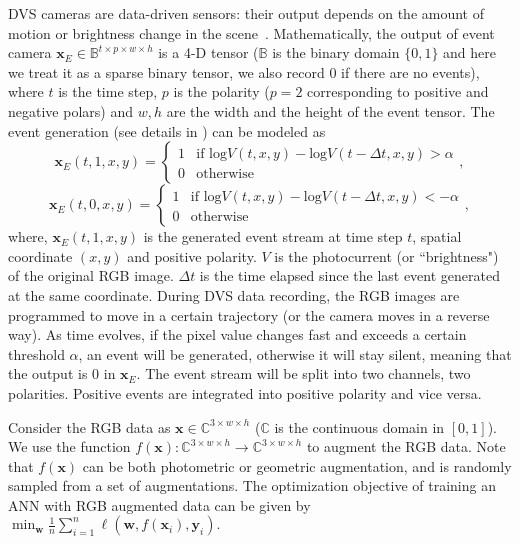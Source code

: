 \documentclass[runningheads]{llncs}
\begin{document}
DVS cameras are data-driven sensors: their output depends on the amount of motion or brightness change in the scene~\cite{gallego2019event}. Mathematically, the output of event camera $\bm{x}_E\in\mathbb{B}^{t\times p\times w\times h}$ is a 4-D tensor ($\mathbb{B}$ is the binary domain $\{0,1\}$ and here we treat it as a sparse binary tensor, \ie we also record 0 if there are no events), where $t$ is the time step, $p$ is the polarity ($p=2$ corresponding to positive and negative polars) and $w,h$ are the width and the height of the event tensor. The event generation (see details in \cite{gallego2019event}) can be modeled as 
{
\begin{equation}
    \bm{x}_E(t, 1, x, y) = \begin{cases}
    1 & \text{if }\mathrm{log}V(t, x, y) - \mathrm{log}V(t-\Delta t,x,y) > \alpha \\
    0 & \text{otherwise}
\end{cases},
\end{equation}
\begin{equation}
    \bm{x}_E(t, 0, x, y) = \begin{cases}
    1 & \text{if }\mathrm{log}V(t, x, y) - \mathrm{log}V(t-\Delta t,x,y) < - \alpha \\
    0 & \text{otherwise}
    \end{cases},
\end{equation}
}where, $\bm{x}_E(t, 1, x, y)$ is the generated event stream at time step $t$, spatial coordinate $(x,y)$ and positive polarity. $V$ is the photocurrent (or ``brightness") of the original RGB image. 
$\Delta t$ is the time elapsed since the last event generated at
the same coordinate.
During DVS data recording, the RGB images are programmed to move in a certain trajectory (or the camera moves in a reverse way). As time evolves, if the pixel value changes fast and exceeds a certain threshold $\alpha$, an event will be generated, otherwise it will stay silent, meaning that the output is 0 in $\bm{x}_E$. The event stream will be split into two channels, \ie two polarities. Positive events are integrated into positive polarity and vice versa.

Consider the RGB data as $\bm{x}\in\mathbb{C}^{3\times w\times h}$ ($\mathbb{C}$ is the continuous domain in $[0, 1]$). We use the function $f(\bm{x}):\mathbb{C}^{3\times w\times h}\rightarrow \mathbb{C}^{3\times w\times h}$ to augment the RGB data. Note that $f(\bm{x})$ can be both photometric or geometric augmentation, and is randomly sampled from a set of augmentations. The optimization objective of training an ANN with RGB augmented data can be given by $\min_{\bm{w}} \frac{1}{n}\sum_{i=1}^n\ell(\bm{w}, f(\bm{x}_i), \bm{y}_i).$
\end{document}
